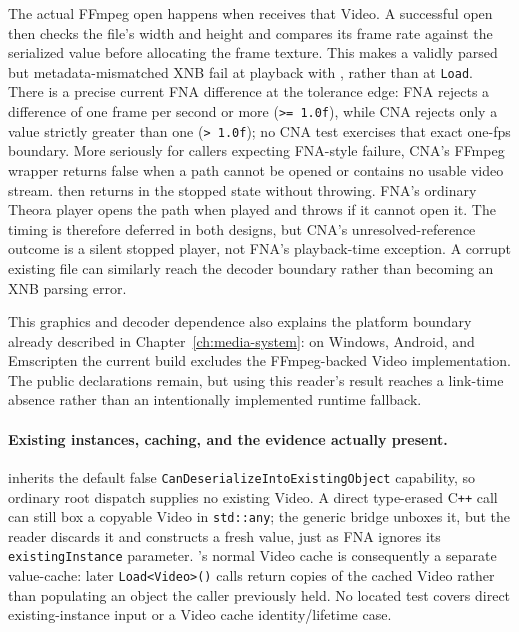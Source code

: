 The actual FFmpeg open happens when  receives that Video.  A
successful open then checks the file's width and height and compares its frame rate against the
serialized value before allocating the frame texture.  This makes a validly parsed but
metadata-mismatched XNB fail at playback with , rather than
at \texttt{Load}.  There is a precise current FNA difference at the tolerance edge: FNA rejects
a difference of one frame per second or more (\texttt{>= 1.0f}), while CNA rejects only a value
strictly greater than one (\texttt{> 1.0f}); no CNA test exercises that exact one-fps boundary.
More seriously for callers expecting FNA-style failure, CNA's FFmpeg wrapper returns false when a
path cannot be opened or contains no usable video stream.   then
returns in the stopped state without throwing.  FNA's ordinary Theora player opens the path when
played and throws  if it cannot open it.  The timing is therefore
deferred in both designs, but CNA's unresolved-reference outcome is a silent stopped player,
not FNA's playback-time exception.  A corrupt existing file can similarly reach the decoder
boundary rather than becoming an XNB parsing error.

This graphics and decoder dependence also explains the platform boundary already described in
Chapter~\ref{ch:media-system}: on Windows, Android, and Emscripten the current build excludes the
FFmpeg-backed Video implementation.  The public declarations remain, but using this reader's
result reaches a link-time absence rather than an intentionally implemented runtime fallback.

\paragraph{Existing instances, caching, and the evidence actually present.}
 inherits the default false
\texttt{CanDeserializeIntoExistingObject} capability, so ordinary root dispatch supplies no
existing Video.  A direct type-erased C\texttt{++} call can still box a copyable Video in
\texttt{std::any}; the generic bridge unboxes it, but the reader discards it and constructs a
fresh value, just as FNA ignores its \texttt{existingInstance} parameter.  's
normal Video cache is consequently a separate value-cache: later \texttt{Load<Video>()} calls
return copies of the cached Video rather than populating an object the caller previously held.
No located test covers direct existing-instance input or a Video cache identity/lifetime case.

